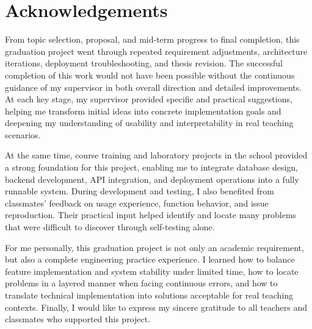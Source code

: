 ﻿\chapter{Acknowledgements}


From topic selection, proposal, and mid-term progress to final completion, this graduation project went through repeated requirement adjustments, architecture iterations, deployment troubleshooting, and thesis revision. The successful completion of this work would not have been possible without the continuous guidance of my supervisor in both overall direction and detailed improvements. At each key stage, my supervisor provided specific and practical suggestions, helping me transform initial ideas into concrete implementation goals and deepening my understanding of usability and interpretability in real teaching scenarios.

At the same time, course training and laboratory projects in the school provided a strong foundation for this project, enabling me to integrate database design, backend development, API integration, and deployment operations into a fully runnable system. During development and testing, I also benefited from classmates' feedback on usage experience, function behavior, and issue reproduction. Their practical input helped identify and locate many problems that were difficult to discover through self-testing alone.

For me personally, this graduation project is not only an academic requirement, but also a complete engineering practice experience. I learned how to balance feature implementation and system stability under limited time, how to locate problems in a layered manner when facing continuous errors, and how to translate technical implementation into solutions acceptable for real teaching contexts. Finally, I would like to express my sincere gratitude to all teachers and classmates who supported this project.

